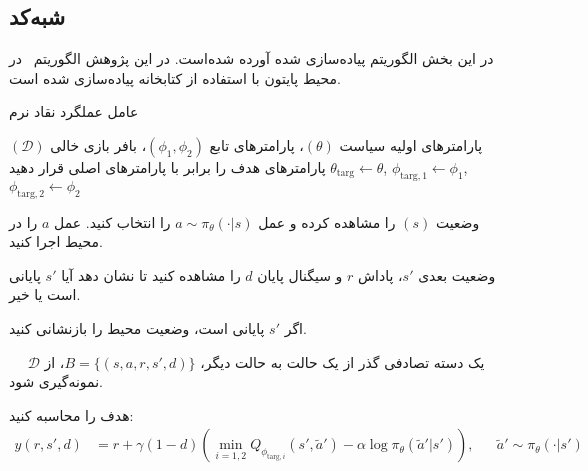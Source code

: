 \subsection{شبه‌کد
	}

در این بخش الگوریتم
پیاده‌سازی شده آورده شده‌است. در این پژوهش الگوریتم~ در محیط پایتون با استفاده از کتابخانه
 \cite{paszke2017automatic}
پیاده‌سازی شده ‌است.




  \begin{algorithm}[H]
	\caption{عامل عملگرد نقاد نرم}\label{alg:SAC}
	\begin{algorithmic}[1]
		 پارامترهای اولیه سیاست
		$(\theta)$، پارامترهای تابع
		$(\phi_1, \phi_2)$،
		بافر بازی خالی $(\mathcal{D})$
		\State پارامترهای هدف را برابر با پارامترهای اصلی قرار دهید
		$\theta_{\text{targ}} \leftarrow \theta$,
		$\phi_{\text{targ}, 1} \leftarrow \phi_1$,
		$\phi_{\text{targ}, 2} \leftarrow \phi_2$
		
		\State 
		وضعیت $(s)$ را مشاهده کرده و عمل 
		$a \sim \pi_{\theta}(\cdot|s)$
		را انتخاب کنید.
		\State عمل $a$ را در محیط اجرا کنید.
		  \State \parbox[t]{\dimexpr\linewidth-\algorithmicindent}{
					وضعیت بعدی $s'$، پاداش $r$ و سیگنال پایان $d$ را مشاهده کنید تا نشان دهد آیا $s'$ پایانی است یا خیر.
			\strut}

		\State اگر $s'$ پایانی است، وضعیت محیط را بازنشانی کنید.
			
		\State یک دسته تصادفی گذر از ‌یک حالت به حالت دیگر، $B = \{ (s,a,r,s',d) \}$، از $\mathcal{D}$
		\Statex \hspace{\algorithmicindent} \hspace{\algorithmicindent} ~~
		 نمونه‌گیری شود.
		
		\State
		هدف را محاسبه کنید:
		\begin{align*}
			y (r,s',d) &= r + \gamma (1-d) \left(\min_{i=1,2} Q_{\phi_{\text{targ}, i}} (s', \tilde{a}') - \alpha \log \pi_{\theta}(\tilde{a}'|s')\right), && \tilde{a}' \sim \pi_{\theta}(\cdot|s')
		\end{align*}
		

\end{algorithmic}
\end{algorithm}
